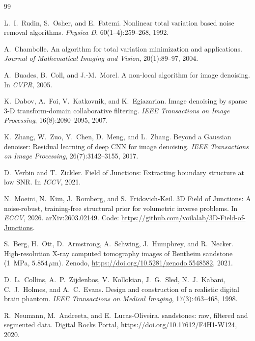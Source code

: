 \documentclass[11pt]{article}
\begin{document}
\begin{thebibliography}{99}

L.~I.~Rudin, S.~Osher, and E.~Fatemi.
\newblock Nonlinear total variation based noise removal algorithms.
\newblock \emph{Physica D}, 60(1--4):259--268, 1992.

A.~Chambolle.
\newblock An algorithm for total variation minimization and applications.
\newblock \emph{Journal of Mathematical Imaging and Vision}, 20(1):89--97,
2004.

A.~Buades, B.~Coll, and J.-M.~Morel.
\newblock A non-local algorithm for image denoising.
\newblock In \emph{CVPR}, 2005.

K.~Dabov, A.~Foi, V.~Katkovnik, and K.~Egiazarian.
\newblock Image denoising by sparse 3-D transform-domain collaborative
filtering.
\newblock \emph{IEEE Transactions on Image Processing}, 16(8):2080--2095,
2007.

K.~Zhang, W.~Zuo, Y.~Chen, D.~Meng, and L.~Zhang.
\newblock Beyond a Gaussian denoiser: Residual learning of deep CNN for
image denoising.
\newblock \emph{IEEE Transactions on Image Processing}, 26(7):3142--3155,
2017.

D.~Verbin and T.~Zickler.
\newblock Field of Junctions: Extracting boundary structure at low SNR.
\newblock In \emph{ICCV}, 2021.

N.~Moeini, N.~Kim, J.~Romberg, and S.~Fridovich-Keil.
\newblock 3D Field of Junctions: A noise-robust, training-free structural prior
for volumetric inverse problems.
\newblock In \emph{ECCV}, 2026. arXiv:2603.02149.
\newblock Code: \url{https://github.com/voilalab/3D-Field-of-Junctions}.

S.~Berg, H.~Ott, D.~Armstrong, A.~Schwing, J.~Humphrey, and R.~Necker.
\newblock High-resolution X-ray computed tomography images of Bentheim
sandstone (1~MPa, $5.854\,\mu\mathrm{m}$).
\newblock Zenodo, \url{https://doi.org/10.5281/zenodo.5548582}, 2021.

D.~L.~Collins, A.~P.~Zijdenbos, V.~Kollokian, J.~G.~Sled, N.~J.~Kabani,
C.~J.~Holmes, and A.~C.~Evans.
\newblock Design and construction of a realistic digital brain phantom.
\newblock \emph{IEEE Transactions on Medical Imaging}, 17(3):463--468, 1998.

R.~Neumann, M.~Andreeta, and E.~Lucas-Oliveira.
 sandstones: raw, filtered and segmented data.
\newblock Digital Rocks Portal, \url{https://doi.org/10.17612/F4H1-W124}, 2020.

\end{thebibliography}
\end{document}
